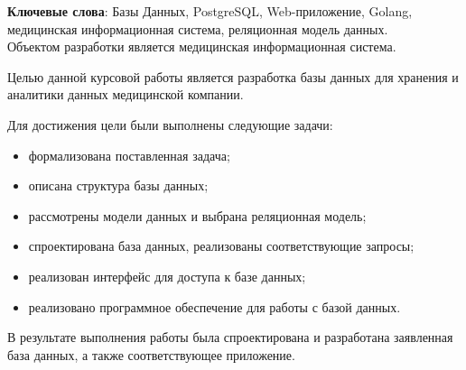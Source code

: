 \begin{essay}{}
    \noindent\textbf{Ключевые слова}: Базы Данных, PostgreSQL, Web-приложение, Golang, медицинская информационная система, реляционная модель данных.\\
    
    Объектом разработки является медицинская информационная система.
    
    Целью данной курсовой работы является разработка базы данных для хранения и аналитики данных медицинской компании.
        
    Для достижения цели были выполнены следующие задачи:

    \begin{itemize}
    	\item формализована поставленная задача;
    	\item описана структура базы данных;
    	\item рассмотрены модели данных и выбрана реляционная модель;
    	\item спроектирована база данных, реализованы соответствующие запросы;
    	\item реализован интерфейс для доступа к базе данных;
    	\item реализовано программное обеспечение для работы с базой данных.
    \end{itemize}
    
    В результате выполнения работы была спроектирована и разработана заявленная база данных, а также соответствующее приложение.
\end{essay}